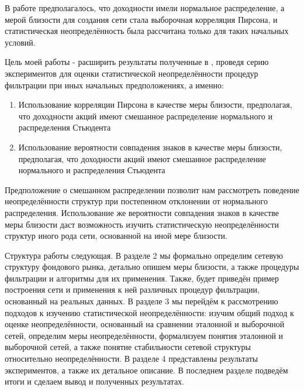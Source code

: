 В работе \cite{measures} предполагалось, что доходности имели нормальное распределение, а мерой близости для создания сети стала выборочная корреляция Пирсона, и статистическая неопределённость была рассчитана только для таких начальных условий.

Цель моей работы - расширить результаты полученные в \cite{measures}, проведя серию экспериментов для оценки статистической неопределённости процедур фильтрации при иных начальных предположениях, а именно:
\begin{enumerate}
	\item Использование корреляции Пирсона в качестве меры близости, предполагая, что доходности акций имеют смешанное распределение нормального и распределения Стьюдента
	\item Использование вероятности совпадения знаков в качестве меры близости, предполагая, что доходности акций имеют смешанное распределение нормального и распределения Стьюдента
\end{enumerate}

Предположение о смешанном распределении позволит нам рассмотреть поведение неопределённости структур при постепенном отклонении от нормального распределения. Использование же вероятности совпадения знаков в качестве меры близости даст возможность изучить статистическую неопределённости структур  иного рода сети, основанной на иной мере близости.

Структура работы следующая. В разделе 2 мы формально определим сетевую структуру фондового рынка, детально опишем меры близости, а также процедуры фильтрации и алгоритмы для их применения. Также, будет приведён пример построения сети и применения к ней различных процедур фильтрации, основанный на реальных данных. В разделе 3 мы перейдём к рассмотрению подходов к изучению статистической неопределённости: изучим общий подход к оценке неопределённости, основанный на сравнении эталонной и выборочной сетей, определим меры неопределённости, формализуем понятия эталонной и выборочной сетей, а также понятие стабильности сетевой структуры относительно неопределённости. В разделе 4 представлены результаты экспериментов, а также их детальное описание. В последнем разделе подведём итоги и сделаем вывод и полученных результатах. 
